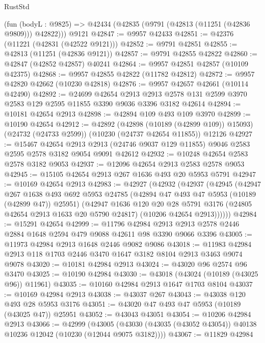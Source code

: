 \begin{lexlean}{RustStd}
\begin{coremodule}
    (fun (bodyL : @9825) => @42434 (@42835 (@9791 (@42813 (@11251 (@42836 @9809))) @42822)))
    @9121
@42847 := @9957 @42433
@42851 := @42376 (@11221 (@42831 (@42522 @9121)))
@42852 := @9791 @42851
@42855 := @42813 (@11251 (@42836 @9121))
@42857 := @9791 @42855 @42822
@42860 := @42847 (@42852 @42857) @40241
@42864 := @9957 @42851 @42857 (@10109 @42375)
@42868 := @9957 @42855 @42822 (@11782 @42812)
@42872 := @9957 @42820 @42662 (@10230 @42818)
@42876 := @9957 @42657 @42661 (@10114 @42490)
@42892 := @24699
    @42654
    @2913
    @2913
    @2578
    @131
    @2599
    @3970
    @2583
    @129
    @2595
    @11855
    @3390
    @9036
    @3396
    @3182
    @42614
@42894 := @10181 @42654 @2913
@42898 := @42894 @109 @493 @109 @3970
@42899 := @10190 @42654
@42912 := @42892
    (@42898 (@10189 (@42899 @109)) @15093)
    (@24732 (@24733 @2599))
    (@10230 (@24737 @42654 @11855))
    @12126
@42927 := @15467
    @42654
    @2913
    @2913
    (@24746 @9037 @129 @11855)
    @9046
    @2583
    @2595
    @2578
    @3182
    @9054
    @9091
    @42612
@42932 := @10248 @42654 @2583 @2578 @3182 @9053
@42937 := @12096 @42654 @2913 @2583 @2578 @9053
@42945 := @15105 @42654 @2913 @267 @1636 @493 @20 @5953 @5791
@42947 := @10169 @42654 @2913
@42983 := @42927
    (@42932
      (@42937
        (@42945
          (@42947
            @267
            @1638
            @493
            @692
            @5953
            @24785
            (@42894 @47 @493 @47 @5953 (@10189 (@42899 @47)) @25951)
            (@42947
              @1636
              @120
              @20
              @28
              @5791
              @3176
              (@24805 @42654 @2913 @1633 @20 @5790 @24817)
              (@10206 @42654 @2913))))))
@42984 := @15291 @42654
@42999 := @11796
    @42984
    @2913
    @2913
    @2578
    @2446
    @2884
    @1648
    @2594
    @479
    @9088
    @42611
    @98
    @3390
    @9066
    @3396
@43005 := @11973 @42984 @2913 @1648 @2446 @9082 @9086
@43018 := @11983 @42984 @2913 @118 @1703 @2446 @3470 @1647 @3182 @8104 @2913 @3463 @9074 @9078
@43020 := @10181 @42984 @2913
@43024 := @43020 @96 @2574 @96 @3470
@43025 := @10190 @42984
@43030 := @43018 (@43024 (@10189 (@43025 @96)) @11961)
@43035 := @10160 @42984 @2913 @1647 @1703 @8104
@43037 := @10169 @42984 @2913
@43038 := @43037 @267
@43043 := @43038 @120 @493 @28 @5953 @3176
@43051 := @43020 @47 @493 @47 @5953 (@10189 (@43025 @47)) @25951
@43052 := @43043 @43051
@43054 := @10206 @42984 @2913
@43066 := @42999
    (@43005 (@43030 (@43035 (@43052 @43054)) @40138 @10236 @12042 (@10230 (@12044 @9075 @3182))))
@43067 := @11829 @42984

\end{coremodule}
\end{lexlean}
